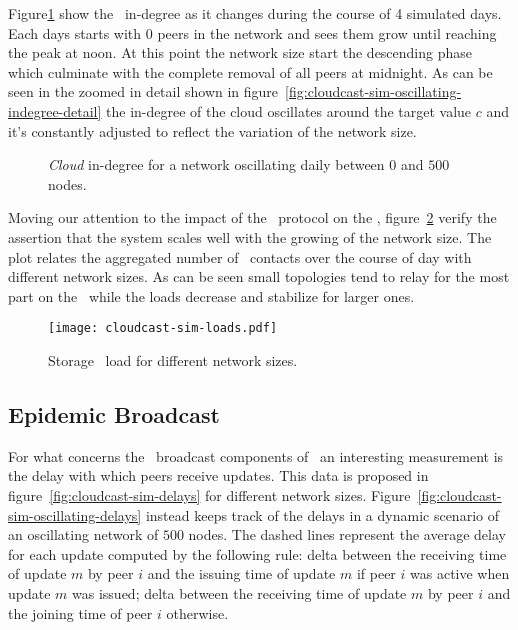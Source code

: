 Figure\ref{fig:cloudcast-sim-oscillating-indegree} show the
\cloud\ in-degree as it changes during the course of 4 simulated
days. Each days starts with 0 peers in the network and sees them grow
until reaching the peak at noon. At this point the network size start
the descending phase which culminate with the complete removal of all
peers at midnight. As can be seen in the zoomed in detail shown in
figure~\ref{fig:cloudcast-sim-oscillating-indegree-detail} the
in-degree of the cloud oscillates around the target value $c$ and it's
constantly adjusted to reflect the variation of the network size.

\begin{figure}[H]
  \centering
  \caption{\emph{Cloud} in-degree for a network oscillating daily
    between $0$ and $500$ nodes.}
  \label{fig:cloudcast-sim-oscillating-indegree}
\end{figure}

Moving our attention to the impact of the \peersampling\ protocol on
the \cloud, figure~\ref{fig:cloudcast-sim-loads} verify the assertion
that the system scales well with the growing of the network size. The
plot relates the aggregated number of \cloud\ contacts over the course
of day with different network sizes. As can be seen small topologies
tend to relay for the most part on the \cloud\ while the loads
decrease and stabilize for  larger ones.

\begin{figure}[H]
  \centering
  \texttt{[image: cloudcast-sim-loads.pdf]}
  \caption{Storage \cloud\ load for different network sizes.}
  \label{fig:cloudcast-sim-loads}
\end{figure}

\subsection{Epidemic Broadcast}
For what concerns the \epidemic\ broadcast components of
\cloudcast\ an interesting measurement is the delay with which peers
receive updates. This data is proposed in
figure~\ref{fig:cloudcast-sim-delays} for different network sizes.
Figure~\ref{fig:cloudcast-sim-oscillating-delays} instead keeps track
of the delays in a dynamic scenario of an oscillating network of
$500$ nodes. The dashed lines represent the average delay for each
update computed by the following rule: delta between the receiving
time of update $m$ by peer $i$ and the issuing time of update $m$ if
peer $i$ was active when update $m$ was issued; delta between the
receiving time of update $m$ by peer $i$ and the joining time of peer
$i$ otherwise.

